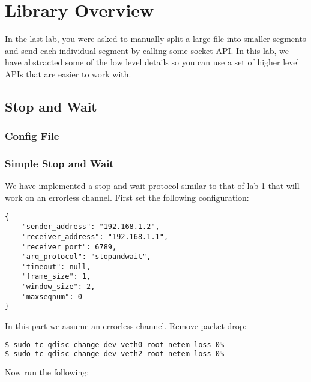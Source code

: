 \documentclass[11pt]{article}
\begin{document}
\section{Library Overview}
In the last lab, you were asked to manually split a large file into smaller segments and send each individual segment by calling some socket API. In this lab, we have abstracted some of the low level details so you can use a set of higher level APIs that are easier to work with.

\subsection{Stop and Wait}
\subsubsection{Config File}


\subsubsection{Simple Stop and Wait}
We have implemented a stop and wait protocol similar to that of lab 1 that will work on an errorless channel. First set the following configuration:

\begin{minipage}{\linewidth}
\begin{lstlisting}[caption={Configuration For Small File}]
{
    "sender_address": "192.168.1.2",
    "receiver_address": "192.168.1.1",
    "receiver_port": 6789,
    "arq_protocol": "stopandwait",
    "timeout": null,
    "frame_size": 1,
    "window_size": 2,
    "maxseqnum": 0
}
\end{lstlisting}
\end{minipage}

In this part we assume an errorless channel. Remove packet drop:
\begin{lstlisting}[language=bash]
$ sudo tc qdisc change dev veth0 root netem loss 0%
$ sudo tc qdisc change dev veth2 root netem loss 0%
\end{lstlisting}
Now run the following:
\end{document}
